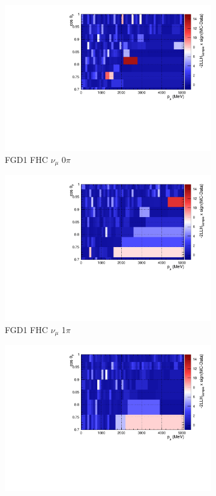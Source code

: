 \begin{figure}[!htbp]
\centering
\begin{subfigure}{.32\textwidth}
  \centering
  \includegraphics[width=0.85\linewidth]{figs/llhcont_Poly574_FGD1_numuCC_0pi.pdf}
  \caption{FGD1 FHC $\nu_{\mu}$ 0$\pi$}
  \label{fig:llhcont_FGD1_numuCC_0pi}
\end{subfigure}
\begin{subfigure}{.32\textwidth}
  \centering
  \includegraphics[width=0.85\linewidth]{figs/llhcont_Poly574_FGD1_numuCC_1pi.pdf}
  \caption{FGD1 FHC $\nu_{\mu}$ 1$\pi$}
  \label{fig:llhcont_FGD1_numuCC_1pi}
\end{subfigure}
\begin{subfigure}{.32\textwidth}
  \centering
  \includegraphics[width=0.85\linewidth]{figs/llhcont_Poly574_FGD1_numuCC_other.pdf}

\end{subfigure}
\end{figure}
